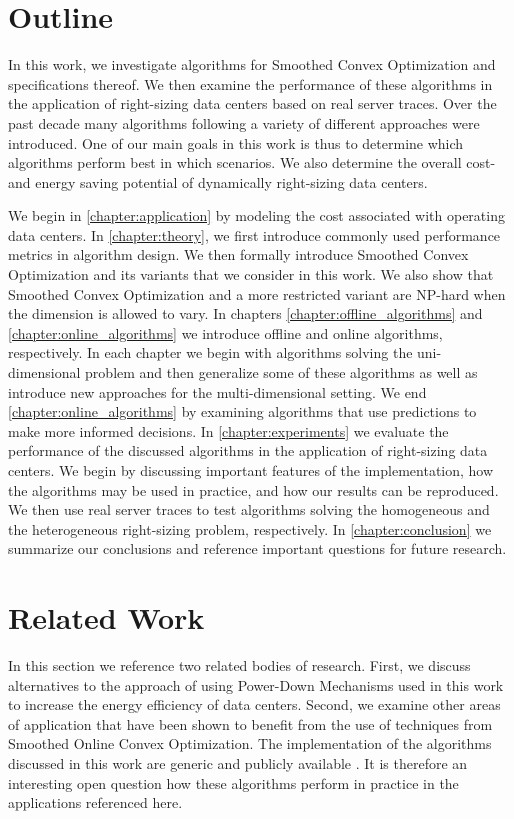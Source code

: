 \section{Outline}

In this work, we investigate algorithms for Smoothed Convex Optimization and specifications thereof. We then examine the performance of these algorithms in the application of right-sizing data centers based on real server traces. Over the past decade many algorithms following a variety of different approaches were introduced. One of our main goals in this work is thus to determine which algorithms perform best in which scenarios. We also determine the overall cost- and energy saving potential of dynamically right-sizing data centers.

We begin in \autoref{chapter:application} by modeling the cost associated with operating data centers. In \autoref{chapter:theory}, we first introduce commonly used performance metrics in algorithm design. We then formally introduce Smoothed Convex Optimization and its variants that we consider in this work. We also show that Smoothed Convex Optimization and a more restricted variant are NP-hard when the dimension is allowed to vary. In chapters \ref{chapter:offline_algorithms} and \ref{chapter:online_algorithms} we introduce offline and online algorithms, respectively. In each chapter we begin with algorithms solving the uni-dimensional problem and then generalize some of these algorithms as well as introduce new approaches for the multi-dimensional setting. We end \autoref{chapter:online_algorithms} by examining algorithms that use predictions to make more informed decisions. In \autoref{chapter:experiments} we evaluate the performance of the discussed algorithms in the application of right-sizing data centers. We begin by discussing important features of the implementation, how the algorithms may be used in practice, and how our results can be reproduced. We then use real server traces to test algorithms solving the homogeneous and the heterogeneous right-sizing problem, respectively. In \autoref{chapter:conclusion} we summarize our conclusions and reference important questions for future research.

\section{Related Work}

In this section we reference two related bodies of research. First, we discuss alternatives to the approach of using Power-Down Mechanisms used in this work to increase the energy efficiency of data centers. Second, we examine other areas of application that have been shown to benefit from the use of techniques from Smoothed Online Convex Optimization. The implementation of the algorithms discussed in this work are generic and publicly available \cite{Hübotter2021}. It is therefore an interesting open question how these algorithms perform in practice in the applications referenced here.

